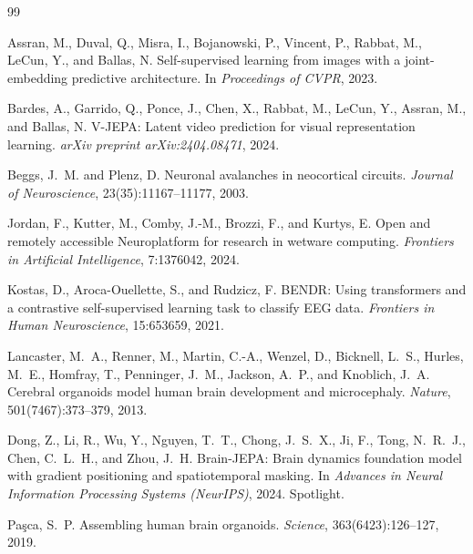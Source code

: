\documentclass{article}
\begin{document}
\begin{thebibliography}{99}

Assran, M., Duval, Q., Misra, I., Bojanowski, P., Vincent, P., Rabbat, M., LeCun, Y., and Ballas, N.
\newblock Self-supervised learning from images with a joint-embedding predictive architecture.
\newblock In \emph{Proceedings of CVPR}, 2023.

Bardes, A., Garrido, Q., Ponce, J., Chen, X., Rabbat, M., LeCun, Y., Assran, M., and Ballas, N.
\newblock V-JEPA: Latent video prediction for visual representation learning.
\newblock \emph{arXiv preprint arXiv:2404.08471}, 2024.

Beggs, J.~M. and Plenz, D.
\newblock Neuronal avalanches in neocortical circuits.
\newblock \emph{Journal of Neuroscience}, 23(35):11167--11177, 2003.

Jordan, F., Kutter, M., Comby, J.-M., Brozzi, F., and Kurtys, E.
\newblock Open and remotely accessible Neuroplatform for research in wetware computing.
\newblock \emph{Frontiers in Artificial Intelligence}, 7:1376042, 2024.

Kostas, D., Aroca-Ouellette, S., and Rudzicz, F.
\newblock BENDR: Using transformers and a contrastive self-supervised learning task to classify EEG data.
\newblock \emph{Frontiers in Human Neuroscience}, 15:653659, 2021.

Lancaster, M.~A., Renner, M., Martin, C.-A., Wenzel, D., Bicknell, L.~S., Hurles, M.~E., Homfray, T., Penninger, J.~M., Jackson, A.~P., and Knoblich, J.~A.
\newblock Cerebral organoids model human brain development and microcephaly.
\newblock \emph{Nature}, 501(7467):373--379, 2013.

Dong, Z., Li, R., Wu, Y., Nguyen, T.~T., Chong, J.~S.~X., Ji, F., Tong, N.~R.~J., Chen, C.~L.~H., and Zhou, J.~H.
\newblock Brain-JEPA: Brain dynamics foundation model with gradient positioning and spatiotemporal masking.
\newblock In \emph{Advances in Neural Information Processing Systems (NeurIPS)}, 2024. Spotlight.

Pa\c{s}ca, S.~P.
\newblock Assembling human brain organoids.
\newblock \emph{Science}, 363(6423):126--127, 2019.


\end{thebibliography}
\end{document}
